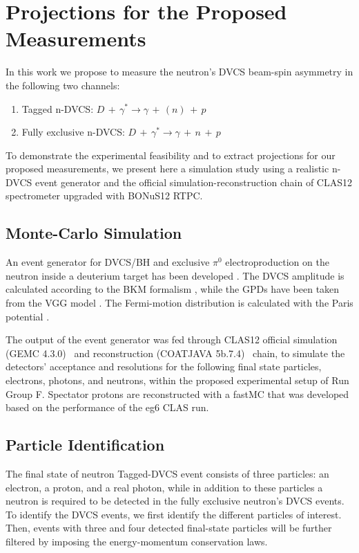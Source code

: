 \chapter{Projections for the Proposed Measurements}
\label{chap:reach}
In this work we propose to measure the neutron's DVCS beam-spin asymmetry in 
the following two channels:
\begin{enumerate}
   \item Tagged n-DVCS: $D\,+\,\gamma^{*}  \longrightarrow 
      \gamma\,+\,(n)\,+\,p$
   \item Fully exclusive n-DVCS: $D\,+\,\gamma^{*}  \longrightarrow \gamma\,+\, 
      n \,+\,p$
\end{enumerate}

To demonstrate the experimental feasibility and to extract projections for our 
proposed measurements, we present here a simulation study using a realistic 
n-DVCS event generator and the official simulation-reconstruction chain of 
CLAS12 spectrometer upgraded with BONuS12 RTPC. 


\section{Monte-Carlo Simulation}
An event generator for DVCS/BH and exclusive $\pi^0$ electroproduction on the 
neutron inside a deuterium target has been developed \cite{ahmed}. The DVCS 
amplitude is calculated according to the BKM formalism \cite{Belitsky:2001ns}, 
while the GPDs have been taken from the VGG model 
\cite{PhysRevD.60.094017,Guidal:2004nd}. The Fermi-motion distribution is 
calculated with the Paris potential \cite{PhysRevC.21.861}.

The output of the event generator was fed through CLAS12 official simulation 
(GEMC 4.3.0)~\cite{clas12-gemc} and reconstruction (COATJAVA 
5b.7.4)~\cite{clas12-coatjava} chain, to simulate the detectors' acceptance and 
resolutions for the following final state particles, electrons, photons, 
and neutrons, within the proposed experimental setup of Run Group F. Spectator 
protons are reconstructed with a fastMC that was developed based on the 
performance of the eg6 CLAS run.

\section{Particle Identification}

The final state of neutron Tagged-DVCS event consists of three particles: an 
electron, a proton, and a real photon, while in addition to these particles a 
neutron is required to be detected in the fully exclusive neutron's DVCS 
events. To identify the DVCS events, we first identify the different particles 
of interest. Then, events with three and four detected final-state particles 
will be further filtered by imposing the energy-momentum conservation laws.

